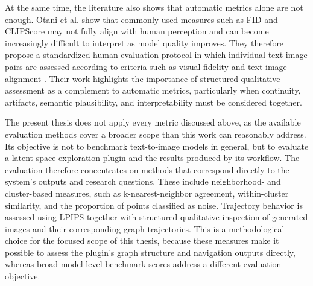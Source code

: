 At the same time, the literature also shows that automatic metrics alone are not enough. Otani et al. show that commonly used measures such as FID and CLIPScore may not fully align with human perception and can become increasingly difficult to interpret as model quality improves. They therefore propose a standardized human-evaluation protocol in which individual text-image pairs are assessed according to criteria such as visual fidelity and text-image alignment \cite{otani2023human}. Their work highlights the importance of structured qualitative assessment as a complement to automatic metrics, particularly when continuity, artifacts, semantic plausibility, and interpretability must be considered together.

The present thesis does not apply every metric discussed above, as the available evaluation methods cover a broader scope than this work can reasonably address. Its objective is not to benchmark text-to-image models in general, but to evaluate a latent-space exploration plugin and the results produced by its workflow. The evaluation therefore concentrates on methods that correspond directly to the system's outputs and research questions. These include neighborhood- and cluster-based measures, such as k-nearest-neighbor agreement, within-cluster similarity, and the proportion of points classified as noise. Trajectory behavior is assessed using LPIPS together with structured qualitative inspection of generated images and their corresponding graph trajectories. This is a methodological choice for the focused scope of this thesis, because these measures make it possible to assess the plugin's graph structure and navigation outputs directly, whereas broad model-level benchmark scores address a different evaluation objective.
